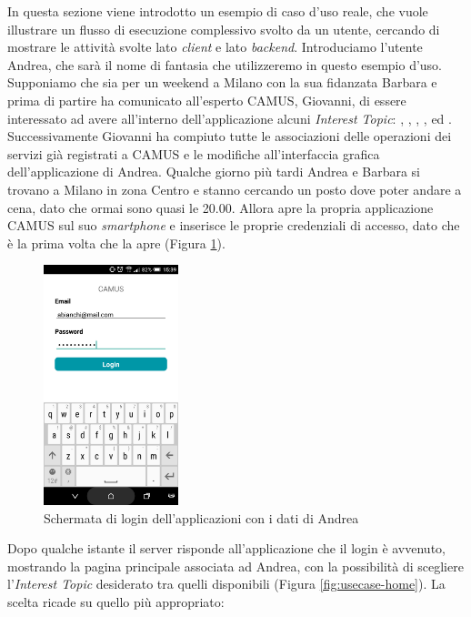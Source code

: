 In questa sezione viene introdotto un esempio di caso d'uso reale, che vuole illustrare un flusso di esecuzione complessivo svolto da un utente, cercando di mostrare le attività svolte lato \emph{client} e lato \emph{backend}.
Introduciamo l'utente Andrea, che sarà il nome di fantasia che utilizzeremo in questo esempio d'uso. Supponiamo che sia per un weekend a Milano con la sua fidanzata Barbara e prima di partire ha comunicato all'esperto CAMUS, Giovanni, di essere \upe interessato ad avere all'interno dell'applicazione alcuni \emph{Interest Topic}: , , , ,  ed . Successivamente Giovanni ha compiuto tutte le associazioni delle operazioni dei servizi già registrati a CAMUS e le modifiche all'interfaccia grafica dell'applicazione di Andrea.
Qualche giorno più tardi Andrea e Barbara si trovano a Milano in zona Centro e stanno cercando un posto dove poter andare a cena, dato che ormai sono quasi le 20.00. Allora apre la propria applicazione CAMUS sul suo \textit{smartphone} e inserisce le proprie credenziali di accesso, dato che è la prima volta che la apre (Figura \ref{fig:usecase-login}). 

\begin{figure}[H]
	\centering
	\includegraphics[width=0.35\textwidth]{4-progettazione-alto-livello/Immagini/login_caso_d'uso.png}
	\caption{Schermata di login dell'applicazioni con i dati di Andrea}\label{fig:usecase-login}
\end{figure}

Dopo qualche istante il server risponde all'applicazione che il login è avvenuto, mostrando la pagina principale associata ad Andrea, con la possibilità di scegliere l'\emph{Interest Topic} desiderato tra quelli disponibili (Figura \ref{fig:usecase-home}). La scelta ricade su quello più appropriato: 

